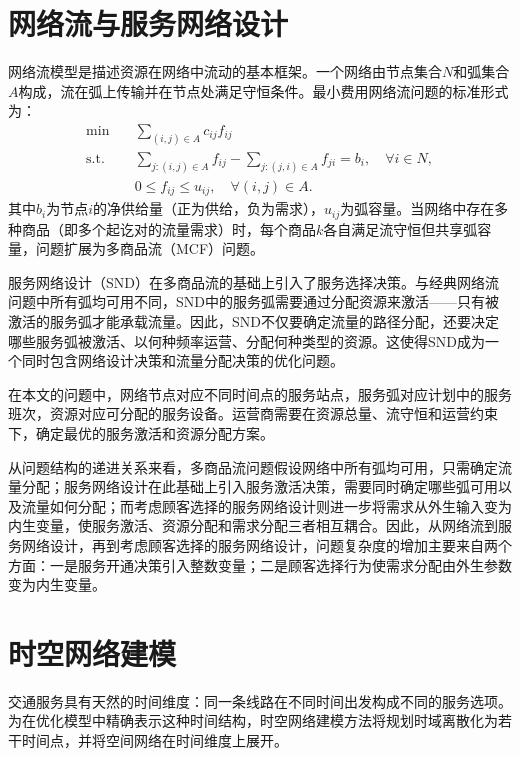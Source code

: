 \section{网络流与服务网络设计}

网络流模型是描述资源在网络中流动的基本框架\citep{ahuja1993network}。一个网络由节点集合$N$和弧集合$A$构成，流在弧上传输并在节点处满足守恒条件。最小费用网络流问题的标准形式为：
\begin{equation}
\begin{aligned}
\min \quad & \sum_{(i,j)\in A} c_{ij} f_{ij}\\
\text{s.t.}\quad & \sum_{j:(i,j)\in A} f_{ij} - \sum_{j:(j,i)\in A} f_{ji} = b_i, \quad \forall i\in N,\\
& 0\le f_{ij}\le u_{ij}, \quad \forall (i,j)\in A.
\end{aligned}
\label{eq:mcf_basic}
\end{equation}
其中$b_i$为节点$i$的净供给量（正为供给，负为需求），$u_{ij}$为弧容量。当网络中存在多种商品（即多个起讫对的流量需求）时，每个商品$k$各自满足流守恒但共享弧容量，问题扩展为多商品流（MCF）问题。

服务网络设计（SND）在多商品流的基础上引入了服务选择决策\citep{magnanti1984network, crainic2000service}。与经典网络流问题中所有弧均可用不同，SND中的服务弧需要通过分配资源来激活——只有被激活的服务弧才能承载流量。因此，SND不仅要确定流量的路径分配，还要决定哪些服务弧被激活、以何种频率运营、分配何种类型的资源。这使得SND成为一个同时包含网络设计决策和流量分配决策的优化问题。

在本文的问题中，网络节点对应不同时间点的服务站点，服务弧对应计划中的服务班次，资源对应可分配的服务设备。运营商需要在资源总量、流守恒和运营约束下，确定最优的服务激活和资源分配方案。

从问题结构的递进关系来看，多商品流问题假设网络中所有弧均可用，只需确定流量分配；服务网络设计在此基础上引入服务激活决策，需要同时确定哪些弧可用以及流量如何分配；而考虑顾客选择的服务网络设计则进一步将需求从外生输入变为内生变量，使服务激活、资源分配和需求分配三者相互耦合。因此，从网络流到服务网络设计，再到考虑顾客选择的服务网络设计，问题复杂度的增加主要来自两个方面：一是服务开通决策引入整数变量；二是顾客选择行为使需求分配由外生参数变为内生变量。

\section{时空网络建模}

交通服务具有天然的时间维度：同一条线路在不同时间出发构成不同的服务选项。为在优化模型中精确表示这种时间结构，时空网络建模方法将规划时域离散化为若干时间点，并将空间网络在时间维度上展开。

